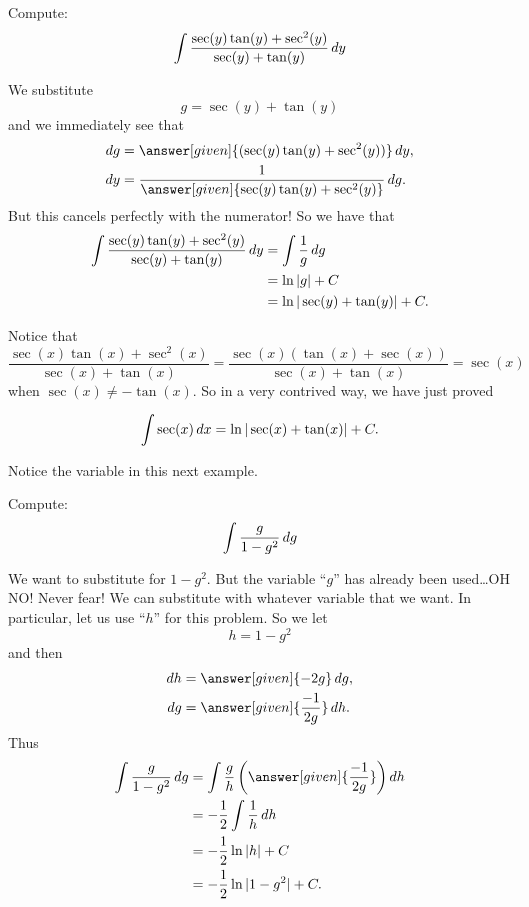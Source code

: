 \documentclass{ximera}
\begin{document}
\begin{example}
Compute:
\[
\int \frac{\sec(y) \tan(y) + \sec^2(y)}{\sec(y) + \tan(y)} \mathop{}\!d y
\]
\begin{explanation}
We substitute
\[
g = \sec(y) + \tan(y)
\]
and we immediately see that
\begin{align*}
  \d g &= \answer[given]{(\sec(y) \tan(y) + \sec^2(y))} \d y,\\
  \d y &= \frac{1}{\answer[given]{\sec(y) \tan(y) + \sec^2(y)}} \d g.
\end{align*}
But this cancels perfectly with the numerator!  
So we have that
\begin{align*}
\int \frac{\sec(y) \tan(y) + \sec^2(y)}{\sec(y) + \tan(y)} \mathop{}\!d y &= \int \frac{1}{g} \mathop{}\!d g  \\
&= \ln|g| + C  \\
&= \ln| \sec(y) + \tan(y) | + C.
\end{align*}
\end{explanation}
\end{example}



Notice that 
\[
\frac{\sec(x) \tan(x) + \sec^2(x)}{\sec(x) + \tan(x)} = \frac{\sec(x) (\tan(x) + \sec(x))}{\sec(x) + \tan(x)} = \sec(x)
\]
when $\sec(x) \neq - \tan(x)$.  
So in a very contrived way, we have just proved

\begin{theorem}
\[
\int \sec(x) \mathop{}\!d x = \ln|\sec(x) + \tan(x)| + C.
\]
\end{theorem}


Notice the variable in this next example.


\begin{example}\label{key example}
Compute:
\[
\int \frac{g}{1-g^2} \mathop{}\!d g
\]
\begin{explanation}
We want to substitute for $1-g^2$.  
But the variable ``$g$'' has already been used\dots OH NO!
Never fear! We can substitute with whatever variable that we want.  
In particular, let us use ``$h$'' for this problem.  
So we let
\[
h = 1 - g^2
\]
and then
\begin{align*}
  \d h &= \answer[given]{-2g} \d g,\\
  \d g &= \answer[given]{\frac{-1}{2g}} \d h.
\end{align*}
Thus
\begin{align*}
\int \frac{g}{1-g^2} \d g &= \int \frac{g}{h} \left( \answer[given]{\frac{-1}{2g}} \right) \d h  \\
&= - \frac{1}{2} \int \frac{1}{h} \d h  \\
&= - \frac{1}{2} \ln|h| + C  \\
&= - \frac{1}{2} \ln|1-g^2| + C.
\end{align*}
\end{explanation}
\end{example}
\end{document}
